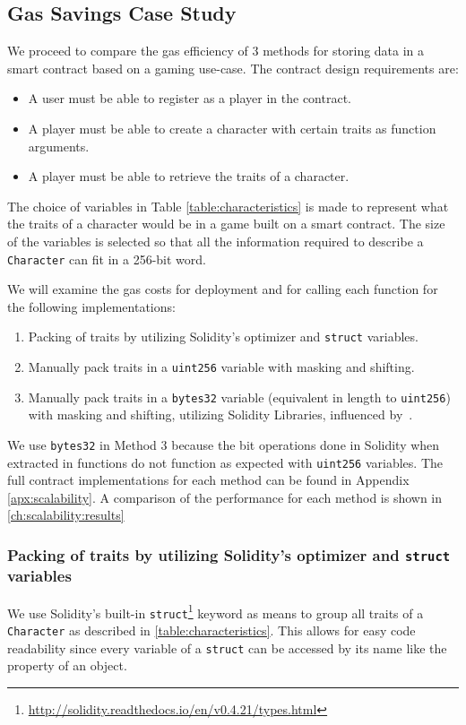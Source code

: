 \subsection{Gas Savings Case Study}

We proceed to compare the gas efficiency of 3 methods for storing data in a smart contract based on a gaming use-case. The contract design requirements are: 
\begin{itemize}
    \item A user must be able to register as a player in the contract.
    \item A player must be able to create a character with certain traits as function arguments.
    \item A player must be able to retrieve the traits of a character.
\end{itemize}




The choice of variables in Table \ref{table:characteristics} is made to represent what the traits of a character would be in a game built on a smart contract. The size of the variables is selected so that all the information required to describe a \texttt{Character} can fit in a 256-bit word. 

We will examine the gas costs for deployment and for calling each function for the following implementations:

\begin{enumerate}
    \item Packing of traits by utilizing Solidity's optimizer and \texttt{struct} variables.
    \item Manually pack traits in a \texttt{uint256} variable with masking and shifting.
    \item Manually pack traits in a \texttt{bytes32} variable (equivalent in length to \texttt{uint256}) with masking and shifting, utilizing Solidity Libraries, influenced by~\cite{virtualstruct}.
\end{enumerate}
We use \texttt{bytes32} in Method 3 because the bit operations done in Solidity when extracted in functions do not function as expected with \texttt{uint256} variables. The full contract implementations for each method can be found in Appendix \ref{apx:scalability}. A comparison of the performance for each method is shown in \ref{ch:scalability:results}%

\subsubsection{Packing of traits by utilizing Solidity's optimizer and \texttt{struct} variables} \label{method1}
We use Solidity's built-in \texttt{struct}\footnote{\url{http://solidity.readthedocs.io/en/v0.4.21/types.html}} keyword as means to group all traits of a \texttt{Character} as described in \ref{table:characteristics}. This allows for easy code readability since every variable of a \texttt{struct} can be accessed by its name like the property of an object. 

